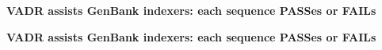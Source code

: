 \documentclass[landscape]{slides}
\begin{document}
\begin{slide}
\begin{center}
\textbf{VADR assists GenBank indexers: each sequence PASSes or FAILs}
\end{center}


\vfill
\end{slide}
\begin{slide}
\begin{center}
\textbf{VADR assists GenBank indexers: each sequence PASSes or FAILs}
\end{center}


\vfill
\end{slide}
\end{document}
